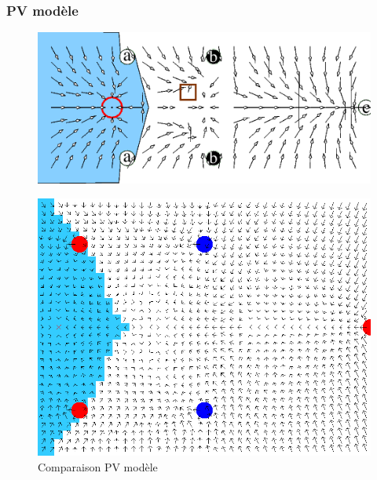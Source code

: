 \documentclass{beamer}
\begin{document}
\begin{frame}
  \frametitle{PV modèle}
  \begin{figure}
    \centering
    \includegraphics[scale=0.3]{pv_article.png}
  \end{figure}
  \begin{figure}
    \centering
    \includegraphics[scale=0.15]{pv1_res.png}
    \caption{Comparaison PV modèle}
  \end{figure}  
\end{frame}
\end{document}
